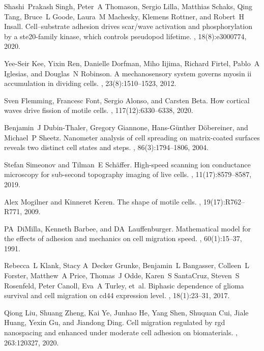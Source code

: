 \documentclass[pre,amsmath]{revtex4}
\begin{document}
\begin{thebibliography}{10}
Shashi~Prakash Singh, Peter~A Thomason, Sergio Lilla, Matthias Schaks, Qing
  Tang, Bruce~L Goode, Laura~M Machesky, Klemens Rottner, and Robert~H Insall.
\newblock Cell--substrate adhesion drives scar/wave activation and
  phosphorylation by a ste20-family kinase, which controls pseudopod lifetime.
, 18(8):e3000774, 2020.

Yee-Seir Kee, Yixin Ren, Danielle Dorfman, Miho Iijima, Richard Firtel, Pablo~A
  Iglesias, and Douglas~N Robinson.
\newblock A mechanosensory system governs myosin ii accumulation in dividing
  cells.
, 23(8):1510--1523, 2012.

Sven Flemming, Francesc Font, Sergio Alonso, and Carsten Beta.
\newblock How cortical waves drive fission of motile cells.
,
  117(12):6330--6338, 2020.

Benjamin~J Dubin-Thaler, Gregory Giannone, Hans-G{\"u}nther D{\"o}bereiner, and
  Michael~P Sheetz.
\newblock Nanometer analysis of cell spreading on matrix-coated surfaces
  reveals two distinct cell states and steps.
, 86(3):1794--1806, 2004.

Stefan Simeonov and Tilman~E Sch{\"a}ffer.
\newblock High-speed scanning ion conductance microscopy for sub-second
  topography imaging of live cells.
, 11(17):8579--8587, 2019.

Alex Mogilner and Kinneret Keren.
\newblock The shape of motile cells.
, 19(17):R762--R771, 2009.

PA~DiMilla, Kenneth Barbee, and DA~Lauffenburger.
\newblock Mathematical model for the effects of adhesion and mechanics on cell
  migration speed.
, 60(1):15--37, 1991.

Rebecca~L Klank, Stacy A~Decker Grunke, Benjamin~L Bangasser, Colleen~L
  Forster, Matthew~A Price, Thomas~J Odde, Karen~S SantaCruz, Steven~S
  Rosenfeld, Peter Canoll, Eva~A Turley, et~al.
\newblock Biphasic dependence of glioma survival and cell migration on cd44
  expression level.
, 18(1):23--31, 2017.

Qiong Liu, Shuang Zheng, Kai Ye, Junhao He, Yang Shen, Shuquan Cui, Jiale
  Huang, Yexin Gu, and Jiandong Ding.
\newblock Cell migration regulated by rgd nanospacing and enhanced under
  moderate cell adhesion on biomaterials.
, 263:120327, 2020.


\end{thebibliography}
\end{document}
